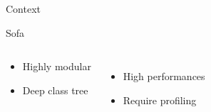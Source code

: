 \documentclass[xcolor={usenames,dvipsnames}]{beamer}
\begin{document}
\begin{frame}{Context}
\begin{exampleblock}{Sofa \cite{Allard07SOFA,Nesme09Preserving,Faure11Sparse}}
\begin{columns}
\begin{itemize}
\begin{itemize}
                        \item Highly modular
                        \item Deep class tree
                    \end{itemize}
            \end{itemize}
            \begin{itemize}
                \item<7-|alert@+-> High performances
                    \vspace{.7cm}
                \item<9-|alert@+-> Require profiling
            \end{itemize}
        \end{columns}
    \end{exampleblock}
\end{frame}
\end{document}
